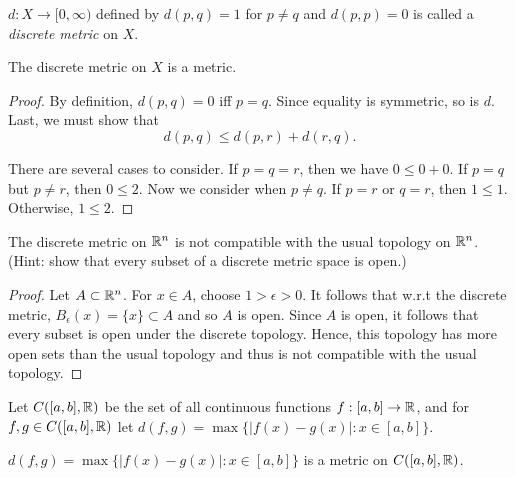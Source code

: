 \documentclass[letterpaper, twoside, 12pt]{book}
\begin{document}
\begin{definition}
  \(d:X\to[0,\infty)\) defined by
  \(d(p,q)=1\) for \(p\not=q\)
  and \(d(p,p)=0\)
  is called a \textit{discrete metric} on \(X\).
\end{definition}


\begin{theorem}[12.4]
  The discrete metric on \(X\) is a metric.
\end{theorem}

\begin{proof}
    By definition, \(d(p, q) = 0\) iff \(p = q\). Since equality is symmetric,
    so is \(d\). Last, we must show that
    \[ d(p, q) \leq d(p, r) + d(r, q) .\]

    There are several cases to consider. If \(p = q = r\), then
    we have \(0 \leq 0 + 0\). If \(p = q\) but \(p \neq r\), then
    \(0 \leq 2 \). Now we consider when \(p \neq q\). If \(p = r\)
    or \(q = r\), then \(1 \leq 1\). Otherwise, \(1 \leq 2\). 
\end{proof}

\begin{theorem}
  The discrete metric on \(\mathbb R^n\) is not compatible with the usual
  topology on \(\mathbb R^n\). (Hint: show that every subset of a discrete
  metric space is open.)
\end{theorem}

\begin{proof}
    Let \(A \subset \mathbb R^n\). For \(x \in A\), choose \(1 > \epsilon > 0\).
    It follows that w.r.t the discrete metric, \(B_{\epsilon}(x) = \{x\} \subset A\)
    and so \(A\) is open. Since \(A\) is open, it follows that every subset
    is open under the discrete topology. Hence, this topology has more 
    open sets than the usual topology and thus is not compatible with the
    usual topology.
\end{proof}

\begin{definition}
  Let \(C([a,b],\mathbb R)\) be the set of all continuous functions
  \(f:[a,b]\to\mathbb R\), and for \(f,g\in C([a,b],\mathbb R)\) let
  \(d(f,g)=\max\{|f(x)-g(x)|:x\in[a,b]\}\).
\end{definition}

\begin{theorem}[12.3]
  \(d(f,g)=\max\{|f(x)-g(x)|:x\in[a,b]\}\) is a metric on \(C([a,b],\mathbb R)\).
\end{theorem}
\end{document}
